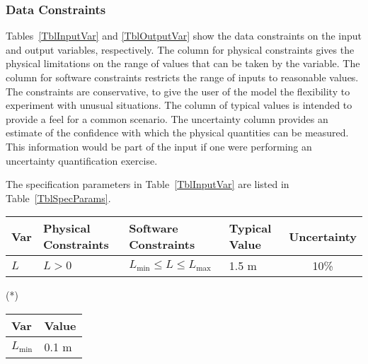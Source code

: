 \documentclass[12pt]{article}
\begin{document}

\subsubsection{Data Constraints} \label{sec_DataConstraints}    

Tables~\ref{TblInputVar} and \ref{TblOutputVar} show the data constraints on the
input and output variables, respectively.  The column for physical constraints gives
the physical limitations on the range of values that can be taken by the
variable.  The column for software constraints restricts the range of inputs to
reasonable values.  The constraints are conservative, to give the user of the
model the flexibility to experiment with unusual situations.  The column of
typical values is intended to provide a feel for a common scenario.  The
uncertainty column provides an estimate of the confidence with which the
physical quantities can be measured.  This information would be part of the
input if one were performing an uncertainty quantification exercise.

The specification parameters in Table~\ref{TblInputVar} are listed in
Table~\ref{TblSpecParams}.

\begin{table}[!h]
  \caption{Input Variables} \label{TblInputVar}
  \renewcommand{\arraystretch}{1.2}
\noindent \begin{longtable*}{l l l l c} 
  \toprule
  \textbf{Var} & \textbf{Physical Constraints} & \textbf{Software Constraints} &
                             \textbf{Typical Value} & \textbf{Uncertainty}\\
  \midrule 
  $L$ & $L > 0$ & $L_{\text{min}} \leq L \leq L_{\text{max}}$ & 1.5 \si[per-mode=symbol] {\metre} & 10\%
  \\
  \bottomrule
\end{longtable*}
\end{table}

\noindent 
\begin{description}
\item[(*)] 
\end{description}

\begin{table}[!h]
\caption{Specification Parameter Values} \label{TblSpecParams}
\renewcommand{\arraystretch}{1.2}
\noindent \begin{longtable*}{l l} 
  \toprule
  \textbf{Var} & \textbf{Value} \\
  \midrule 
  $L_\text{min}$ & 0.1 \si{\metre}\\
  \bottomrule
\end{longtable*}
\end{table}
\end{document}
